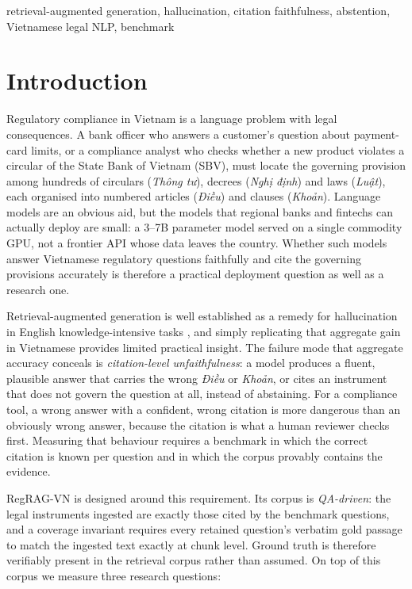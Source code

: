 \documentclass[conference,a4paper]{IEEEtran}
\begin{document}
\begin{IEEEkeywords}
retrieval-augmented generation, hallucination, citation faithfulness, abstention, Vietnamese legal NLP, benchmark
\end{IEEEkeywords}

\section{Introduction}
\label{sec:intro}

Regulatory compliance in Vietnam is a language problem with legal consequences. A bank officer who answers a customer's question about payment-card limits, or a compliance analyst who checks whether a new product violates a circular of the State Bank of Vietnam (SBV), must locate the governing provision among hundreds of circulars (\emph{Thông tư}), decrees (\emph{Nghị định}) and laws (\emph{Luật}), each organised into numbered articles (\emph{Điều}) and clauses (\emph{Khoản}). Language models are an obvious aid, but the models that regional banks and fintechs can actually deploy are small: a 3--7B parameter model served on a single commodity GPU, not a frontier API whose data leaves the country. Whether such models answer Vietnamese regulatory questions faithfully and cite the governing provisions accurately is therefore a practical deployment question as well as a research one.

Retrieval-augmented generation is well established as a remedy for hallucination in English knowledge-intensive tasks \cite{lewis2020rag,gao2024ragsurvey}, and simply replicating that aggregate gain in Vietnamese provides limited practical insight. The failure mode that aggregate accuracy conceals is \emph{citation-level unfaithfulness}: a model produces a fluent, plausible answer that carries the wrong \emph{Điều} or \emph{Khoản}, or cites an instrument that does not govern the question at all, instead of abstaining. For a compliance tool, a wrong answer with a confident, wrong citation is more dangerous than an obviously wrong answer, because the citation is what a human reviewer checks first. Measuring that behaviour requires a benchmark in which the correct citation is known per question and in which the corpus provably contains the evidence.

RegRAG-VN is designed around this requirement. Its corpus is \emph{QA-driven}: the legal instruments ingested are exactly those cited by the benchmark questions, and a coverage invariant requires every retained question's verbatim gold passage to match the ingested text exactly at chunk level. Ground truth is therefore verifiably present in the retrieval corpus rather than assumed. On top of this corpus we measure three research questions:
\end{document}
